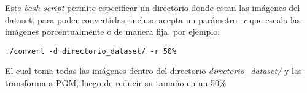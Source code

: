 Este \emph{bash script} permite especificar un directorio donde estan las imágenes del dataset, para poder convertirlas, incluso acepta un parámetro \emph{-r} que escala las imágenes porcentualmente o de manera fija, por ejemplo:

\begin{verbatim}
./convert -d directorio_dataset/ -r 50%
\end{verbatim}

El cual toma todas las imágenes dentro del directorio \emph{directorio\_dataset\slash} y las transforma a PGM, luego de reducir su tamaño en un 50\%